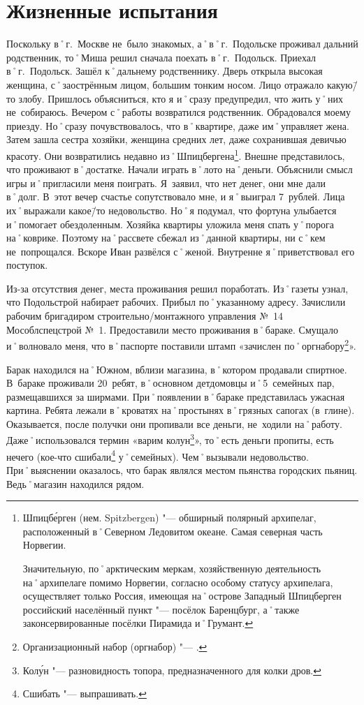 ﻿\chapter{Жизненные испытания}

Поскольку в˚г.~Москве не~было знакомых, а˚в˚г.~Подольске проживал дальний родственник, то˚Миша решил сначала поехать в˚г.~Подольск. Приехал в˚г.~Подольск. Зашёл к˚дальнему родственнику. Дверь открыла высокая женщина, с˚заострённым лицом, большим тонким носом. Лицо отражало какую\=/то злобу. Пришлось объясниться, кто я и˚сразу предупредил, что жить у˚них не~собираюсь. Вечером с˚работы возвратился родственник. Обрадовался моему приезду. Но˚сразу почувствовалось, что в˚квартире, даже им˚управляет жена. Затем зашла сестра хозяйки, женщина средних лет, даже сохранившая девичью красоту. Они возвратились недавно из˚Шпицбергена\footnote{Шпицб\'{е}рген (нем. Spitzbergen) "--- обширный полярный архипелаг, расположенный в˚Северном Ледовитом океане. Самая северная часть Норвегии. 

Значительную, по˚арктическим меркам, хозяйственную деятельность на˚архипелаге помимо Норвегии, согласно особому статусу архипелага, осуществляет только Россия, имеющая на˚острове Западный Шпицберген российский населённый пункт "--- посёлок Баренцбург, а˚также законсервированные посёлки Пирамида и˚Грумант.}. 
Внешне представилось, что проживают в˚достатке. Начали играть в˚лото на˚деньги. Объяснили смысл игры и˚пригласили меня поиграть. Я~заявил, что нет денег, они мне дали в˚долг. В~этот вечер счастье сопутствовало мне, и я˚выиграл 7~рублей. Лица их˚выражали какое\=/то недовольство. Но˚я подумал, что фортуна улыбается и˚помогает обездоленным. Хозяйка квартиры уложила меня спать у˚порога на˚коврике. Поэтому на˚рассвете сбежал из˚данной квартиры, ни с˚кем не~попрощался. Вскоре Иван развёлся с˚женой. Внутренне я˚приветствовал его поступок.

Из-за отсутствия денег, места проживания решил поработать. Из˚газеты узнал, что Подольстрой набирает рабочих. Прибыл по˚указанному адресу. Зачислили рабочим бригадиром строительно\-/монтажного управления №~14 Мособлспецстрой №~1. Предоставили место проживания в˚бараке. Смущало и˚волновало меня, что в˚паспорте поставили штамп «зачислен по˚оргнабору\footnote{Организационный набор (оргнабор) "--- .}». 

Барак находился на˚Южном, вблизи магазина, в˚котором продавали спиртное. В~бараке проживали 20~ребят, в˚основном детдомовцы и˚5~семейных пар, размещавшихся за ширмами. При˚появлении в˚бараке представилась ужасная картина. Ребята лежали в˚кроватях на˚простынях в˚грязных сапогах (в~глине). Оказывается, после получки они пропивали все деньги, не~ходили на˚работу. Даже˚использовался термин «варим колун\footnote{Кол\'{у}н "--- разновидность топора, предназначенного для колки дров.}», то˚есть деньги пропиты, есть нечего (кое-что сшибали\footnote{Сшибать "--- выпрашивать.} у˚семейных). Чем˚вызывали недовольство. При˚выяснении оказалось, что барак являлся местом пьянства городских пьяниц. Ведь˚магазин находился рядом. 

